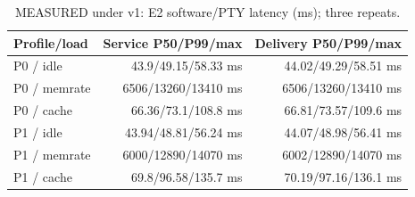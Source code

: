 \begin{table}[H]
\centering\small
\caption{MEASURED under v1: E2 software/PTY latency (ms); three repeats.}\label{tab:e2}
\begin{tabular}{lrr}
\toprule
Profile/load & Service P50/P99/max & Delivery P50/P99/max \\
\midrule
P0 / idle & 43.9/49.15/58.33 ms & 44.02/49.29/58.51 ms \\
P0 / memrate & 6506/13260/13410 ms & 6506/13260/13410 ms \\
P0 / cache & 66.36/73.1/108.8 ms & 66.81/73.57/109.6 ms \\
P1 / idle & 43.94/48.81/56.24 ms & 44.07/48.98/56.41 ms \\
P1 / memrate & 6000/12890/14070 ms & 6002/12890/14070 ms \\
P1 / cache & 69.8/96.58/135.7 ms & 70.19/97.16/136.1 ms \\
\bottomrule
\end{tabular}
\end{table}

